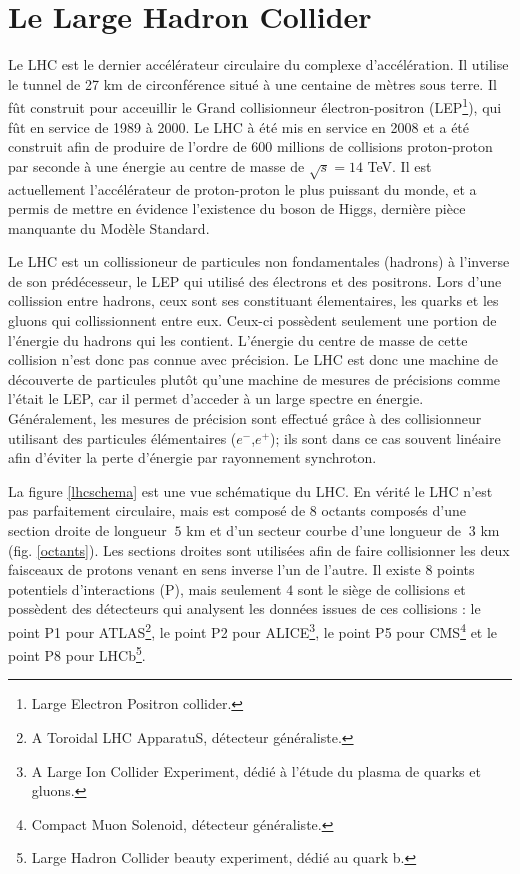 \section{Le Large Hadron Collider}
Le LHC est le dernier accélérateur circulaire du complexe d'accélération. Il utilise le tunnel de 27 km de circonférence situé à une centaine de mètres sous terre. Il fût construit pour acceuillir le Grand collisionneur électron-positron (LEP\footnote{Large Electron Positron collider.}), qui fût en service de 1989 à 2000. Le LHC à été mis en service en 2008 et a été construit afin de produire de l'ordre de 600 millions de collisions proton-proton par seconde à une énergie au centre de masse de $\sqrt{s}=14$ TeV. Il est actuellement l'accélérateur de proton-proton le plus puissant du monde, et a permis de mettre en évidence l'existence du boson de Higgs, dernière pièce manquante du Modèle Standard.

Le LHC est un collissioneur de particules non fondamentales (hadrons) à l'inverse de son prédécesseur, le LEP qui utilisé des électrons et des positrons. Lors d'une collission entre hadrons, ceux sont ses constituant élementaires, les quarks et les gluons qui collissionnent entre eux. Ceux-ci possèdent seulement une portion de l'énergie du hadrons qui les contient. L'énergie du centre de masse de cette collision n'est donc pas connue avec précision. Le LHC est donc une machine de découverte de particules plutôt qu'une machine de mesures de précisions comme l'était le LEP, car il permet d'acceder à un large spectre en énergie. Généralement, les mesures de précision sont effectué grâce à des collisionneur utilisant des particules élémentaires ($e^{-}$,$e^{+}$); ils sont dans ce cas souvent linéaire afin d'éviter la perte d'énergie par rayonnement synchroton.

La figure \ref{lhcschema} est une vue schématique du LHC. En vérité le LHC n'est pas parfaitement circulaire, mais est composé de $8$ octants composés d'une section droite de longueur $~5$ km et d'un secteur courbe d'une longueur de $~3$ km (fig. \ref{octants}). Les sections droites sont utilisées afin de faire collisionner les deux faisceaux de protons venant en sens inverse l'un de l'autre. Il existe $8$ points potentiels d'interactions (P), mais seulement $4$ sont le siège de collisions et possèdent des détecteurs qui analysent les données issues de ces collisions : le point P1 pour ATLAS\footnote{A Toroidal LHC ApparatuS, détecteur généraliste.}, le point P2 pour ALICE\footnote{A Large Ion Collider Experiment, dédié à l'étude du plasma de quarks et gluons.}, le point P5 pour CMS\footnote{Compact Muon Solenoid, détecteur généraliste.} et le point P8 pour LHCb\footnote{Large Hadron Collider beauty experiment, dédié au quark b.}.

